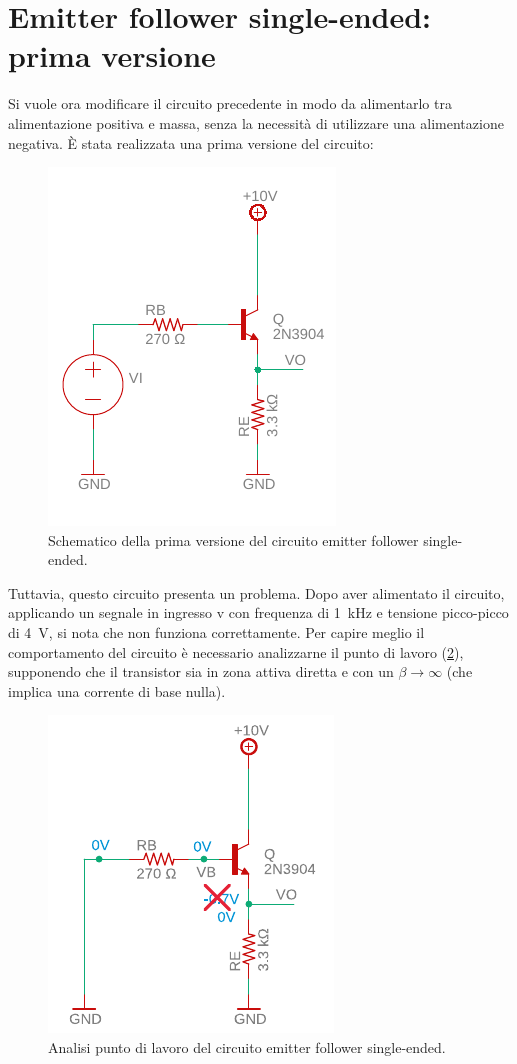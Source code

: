 \section{Emitter follower single-ended: prima versione}
Si vuole ora modificare il circuito precedente in modo da alimentarlo tra alimentazione positiva e massa, senza la necessità di utilizzare una alimentazione negativa. \`E stata realizzata una prima versione del circuito:
\begin{figure}[h!]
	\centering
	\includegraphics[width=0.4\linewidth]{./OtherFiles/Laboratorio 2/emitter follower}
	\caption{Schematico della prima versione del circuito emitter follower single-ended.}
	\label{fig:emitterfollwer_se}
\end{figure}

\noindent
Tuttavia, questo circuito presenta un problema. Dopo aver alimentato il circuito, applicando un segnale in ingresso v con frequenza di \SI{1}{\kilo\hertz} e tensione picco-picco di \SI{4}{\volt}, si nota che non funziona correttamente. Per capire meglio il comportamento del circuito è necessario analizzarne il punto di lavoro (\Fig\ref{fig:emitterfollwer_se_DC}), supponendo che il transistor sia in zona attiva diretta e con un $\beta\to\infty$ (che implica una corrente di base nulla).
\begin{figure}[h!]
	\centering
	\includegraphics[width=0.4\linewidth]{./OtherFiles/Laboratorio 2/emitter follower_punto di lavoro-printout}
	\caption{Analisi punto di lavoro del circuito emitter follower single-ended.}
	\label{fig:emitterfollwer_se_DC}
\end{figure}

